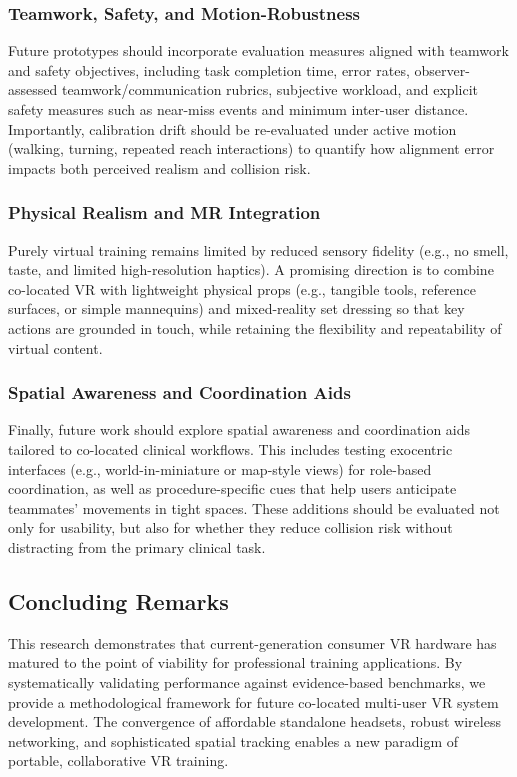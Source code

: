 \documentclass[conference]{IEEEtran}
\begin{document}
\subsubsection{Teamwork, Safety, and Motion-Robustness}
Future prototypes should incorporate evaluation measures aligned with teamwork and safety objectives, including task completion time, error rates, observer-assessed teamwork/communication rubrics, subjective workload, and explicit safety measures such as near-miss events and minimum inter-user distance. Importantly, calibration drift should be re-evaluated under active motion (walking, turning, repeated reach interactions) to quantify how alignment error impacts both perceived realism and collision risk.

\subsubsection{Physical Realism and MR Integration}
Purely virtual training remains limited by reduced sensory fidelity (e.g., no smell, taste, and limited high-resolution haptics). A promising direction is to combine co-located VR with lightweight physical props (e.g., tangible tools, reference surfaces, or simple mannequins) and mixed-reality set dressing so that key actions are grounded in touch, while retaining the flexibility and repeatability of virtual content.

\subsubsection{Spatial Awareness and Coordination Aids}
Finally, future work should explore spatial awareness and coordination aids tailored to co-located clinical workflows. This includes testing exocentric interfaces (e.g., world-in-miniature or map-style views) for role-based coordination, as well as procedure-specific cues that help users anticipate teammates' movements in tight spaces. These additions should be evaluated not only for usability, but also for whether they reduce collision risk without distracting from the primary clinical task.


\subsection{Concluding Remarks}

This research demonstrates that current-generation consumer VR hardware has matured to the point of viability for professional training applications. By systematically validating performance against evidence-based benchmarks, we provide a methodological framework for future co-located multi-user VR system development. The convergence of affordable standalone headsets, robust wireless networking, and sophisticated spatial tracking enables a new paradigm of portable, collaborative VR training.
\end{document}
